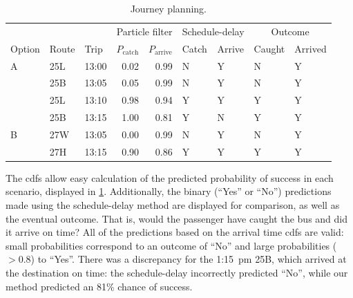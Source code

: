 \begin{knitrout}\small
{}\color{fgcolor}\begin{table}

\caption{\label{tab:eta_journey_results}Journey planning.}
\centering
\fontsize{8}{10}\selectfont
\begin{tabular}[t]{lllrrllll}
\toprule
\multicolumn{1}{c}{} & \multicolumn{1}{c}{} & \multicolumn{1}{c}{} & \multicolumn{2}{c}{Particle filter} & \multicolumn{2}{c}{Schedule-delay} & \multicolumn{2}{c}{Outcome} \\
\cmidrule(l{3pt}r{3pt}){4-5} \cmidrule(l{3pt}r{3pt}){6-7} \cmidrule(l{3pt}r{3pt}){8-9}
Option & Route & Trip & $P_\text{catch}$ & $P_\text{arrive}$ & Catch & Arrive & Caught & Arrived\\
\midrule
A & 25L & 13:00 & 0.02 & 0.99 & N & Y & N & Y\\
 & 25B & 13:05 & 0.05 & 0.99 & N & Y & N & Y\\
 & 25L & 13:10 & 0.98 & 0.94 & Y & Y & Y & Y\\
 & 25B & 13:15 & 1.00 & 0.81 & Y & N & Y & Y\\
\midrule
B & 27W & 13:05 & 0.00 & 0.99 & N & Y & N & Y\\
 & 27H & 13:15 & 0.90 & 0.86 & Y & Y & Y & Y\\
\bottomrule
\end{tabular}
\end{table}


\end{knitrout}


The \glspl{cdf} allow easy calculation of the predicted probability of success in each scenario, displayed in \cref{tab:eta_journey_results}. Additionally, the binary (``Yes'' or ``No'') predictions made using the schedule-delay method are displayed for comparison, as well as the eventual outcome. That is, would the passenger have caught the bus and did it arrive on time? All of the predictions based on the \pf{} arrival time \glspl{cdf} are valid: small probabilities correspond to an outcome of ``No'' and large probabilities ($>0.8$) to ``Yes''. There was a discrepancy for the 1:15~pm 25B, which arrived at the destination on time: the schedule-delay incorrectly predicted ``No'', while our method predicted an 81\% chance of success.


